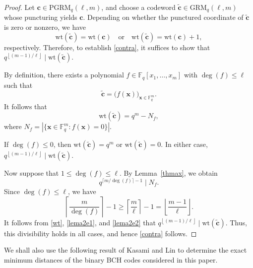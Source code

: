 \documentclass[journal,onecolumn]{IEEEtran}
\newcommand{\F}{\mathbb{F}}
\newcommand{\wt}{\mathrm{wt}}
\newcommand{\GRM}{\mathrm{GRM}}
\newcommand{\PGRM}{\mathrm{PGRM}}
\begin{document}
\begin{proof}
Let $\mathbf{c}\in\PGRM_q(\ell,m)$, and choose a codeword
$\widetilde{\mathbf{c}}\in\GRM_q(\ell,m)$ whose puncturing yields
$\mathbf{c}$. Depending on whether the punctured coordinate of
$\widetilde{\mathbf{c}}$ is zero or nonzero, we have
\begin{equation*}
\wt(\widetilde{\mathbf{c}})=\wt(\mathbf{c})
\quad\text{or}\quad
\wt(\widetilde{\mathbf{c}})=\wt(\mathbf{c})+1,
\end{equation*}
respectively.
Therefore, to establish \eqref{contra}, it suffices to show that
$q^{\left\lfloor(m-1)/\ell\right\rfloor}\mid
\wt(\widetilde{\mathbf{c}})$.

By definition, there exists a polynomial
$f\in\F_q[x_1,\ldots,x_m]$ with $\deg(f)\leq\ell$ such that
\begin{equation*}
\widetilde{\mathbf{c}}
=
\bigl(f(\mathbf{x})\bigr)_{\mathbf{x}\in\mathbb{F}_q^m}.
\end{equation*}
It follows that
\begin{equation}\label{wt}
\wt(\widetilde{\mathbf{c}})=q^m-N_f,
\end{equation}
where
$N_f=|\{\mathbf{x}\in\F_q^m:f(\mathbf{x})=0\}|$.

If $\deg(f)\leq 0$, then
$\wt(\widetilde{\mathbf{c}})=q^m$ or
$\wt(\widetilde{\mathbf{c}})=0$. In either case,  
$q^{\left\lfloor(m-1)/\ell\right\rfloor}\mid
\wt(\widetilde{\mathbf{c}})$.

Now suppose that $1\leq\deg(f)\leq\ell$. By Lemma~\ref{thmax}, we obtain 
\begin{equation}\label{lema2e1}
q^{\lceil m/\deg(f)\rceil-1}\mid N_f.
\end{equation}
Since $\deg(f)\leq\ell$, we have
\begin{equation}\label{lema2e2}
\left\lceil\frac{m}{\deg(f)}\right\rceil-1
\geq
\left\lceil\frac{m}{\ell}\right\rceil-1
=
\left\lfloor\frac{m-1}{\ell}\right\rfloor.
\end{equation}
It follows from \eqref{wt}, \eqref{lema2e1}, and \eqref{lema2e2} that
$q^{\left\lfloor(m-1)/\ell\right\rfloor}\mid
\wt(\widetilde{\mathbf{c}})$. Thus, this divisibility holds in all cases,
and hence \eqref{contra} follows.
\end{proof}




We shall also use the following result of Kasami and Lin \cite{KasamiLin1972} to determine
the exact minimum distances of the binary BCH codes considered in this paper.
\end{document}
